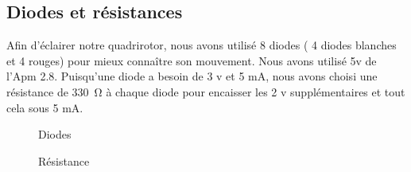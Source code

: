 	\subsection {Diodes  et résistances}
	Afin d'éclairer notre quadrirotor, nous avons utilisé 8 diodes ( 4 diodes blanches et 4  rouges) pour mieux connaître son mouvement. Nous avons utilisé 5v  de l'Apm 2.8. Puisqu'une diode a besoin de 3 v et 5 mA, nous avons choisi une résistance de \SI{330}{\ohm} à chaque diode pour encaisser les 2 v supplémentaires et tout cela sous 5 mA.
	\begin{figure}[h]
		\centering
		\begin{minipage}{0.49\textwidth}
			\hspace*{-0.7cm}
		\centering
			\caption{Diodes}
			\label{fig:my_label}
		\end{minipage}
		\begin{minipage}{0.49\textwidth}
		\hspace*{0.2cm}	
		\centering
			\caption{Résistance}
		\label{fig:my_label}
		\end{minipage}
	\end{figure}
